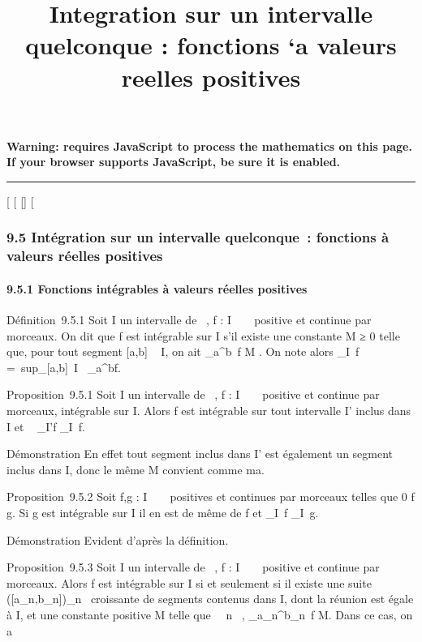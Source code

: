 \documentclass[]{article}
\title{Integration sur un intervalle quelconque : fonctions `a valeurs reelles
positives}
\author{}
\date{}
\begin{document}
\maketitle

\textbf{Warning: 
requires JavaScript to process the mathematics on this page.\\ If your
browser supports JavaScript, be sure it is enabled.}

\begin{center}\rule{3in}{0.4pt}\end{center}

{[}
{[}
{[}{]}
{[}

\subsubsection{9.5 Intégration sur un intervalle quelconque~: fonctions
à valeurs réelles positives}

\paragraph{9.5.1 Fonctions intégrables à valeurs réelles positives}

Définition~9.5.1 Soit I un intervalle de ~, f : I \rightarrow~ ~ positive et
continue par morceaux. On dit que f est intégrable sur I s'il existe une
constante M ≥ 0 telle que, pour tout segment {[}a,b{]} \subset~ I, on ait
\int  \_a^b~f \leq M . On note alors
\int  \_I~f =\
sup\_{[}a,b{]}\subset~I\int ~
\_a^bf.

Proposition~9.5.1 Soit I un intervalle de ~, f : I \rightarrow~ ~ positive et
continue par morceaux, intégrable sur I. Alors f est intégrable sur tout
intervalle I' inclus dans I et \int ~
\_I'f \leq\int  \_I~f.

Démonstration En effet tout segment inclus dans I' est également un
segment inclus dans I, donc le même M convient comme ma\jmathorant.

Proposition~9.5.2 Soit f,g : I \rightarrow~ ~ positives et continues par morceaux
telles que 0 \leq f \leq g. Si g est intégrable sur I il en est de même de f
et \int  \_I~f
\leq\int  \_I~g.

Démonstration Evident d'après la définition.

Proposition~9.5.3 Soit I un intervalle de ~, f : I \rightarrow~ ~ positive et
continue par morceaux. Alors f est intégrable sur I si et seulement si
il existe une suite ({[}a\_n,b\_n{]})\_n\in\mathbb{N}~
croissante de segments contenus dans I, dont la réunion est égale à I,
et une constante positive M telle que \forall~~n \in \mathbb{N}~,
\int  \_a\_n^b\_n~f
\leq M. Dans ce cas, on a
\end{document}
